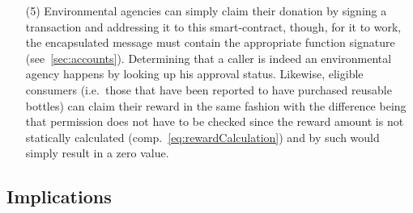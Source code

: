 \begin{itemize}
	\item [(5)] Environmental agencies can simply claim their donation by signing a transaction and addressing it to this smart-contract, though, for it to work, the encapsulated message must contain the appropriate function signature (see~\ref{sec:accounts}). Determining that a caller is indeed an environmental agency happens by looking up his approval status. Likewise, eligible consumers (i.e.~those that have been reported to have purchased reusable bottles) can claim their reward in the same fashion with the difference being that permission does not have to be checked since the reward amount is not statically calculated (comp.~\autoref{eq:rewardCalculation}) and by such would simply result in a zero value.
\end{itemize}

\subsection{Implications}








 

